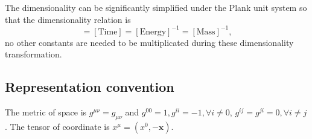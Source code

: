 The dimensionality can be significantly simplified under the Plank unit system so that the dimensionality relation is
\begin{equation}
[\text{Length}]=[\text{Time}]=[\text{Energy}]^{-1}=[\text{Mass}]^{-1},
\end{equation}
no other constants are needed to be multiplicated during these dimensionality transformation.


\subsection{Representation convention}

The metric of  space is $g^{\mu\nu}=g_{\mu\nu}$ and $g^00=1, g^{ii}=-1,\forall i\ne0$, $g^{ij}=g^{ji}=0,\forall i\ne j$. The tensor of coordinate is $x^\mu=(x^0,-\boldsymbol{x})$. 

